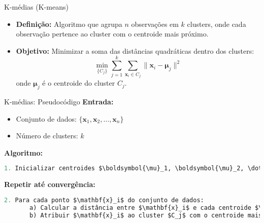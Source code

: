 \documentclass{beamer}
\begin{document}
\begin{frame}{K-médias (K-means)}
    \begin{itemize}
        \item \textbf{Definição:} Algoritmo que agrupa \( n \) observações em \( k \) clusters, onde cada observação pertence ao cluster com o centroide mais próximo.
        \item \textbf{Objetivo:} Minimizar a soma das distâncias quadráticas dentro dos clusters:
        \[
        \min_{\{C_j\}} \sum_{j=1}^{k} \sum_{\mathbf{x}_i \in C_j} \|\mathbf{x}_i - \boldsymbol{\mu}_j\|^2
        \]
        onde \( \boldsymbol{\mu}_j \) é o centroide do cluster \( C_j \).
    \end{itemize}
     \vspace{-0.5cm}
    \begin{center}
    \end{center}
\end{frame}


\begin{frame}[fragile]{K-médias: Pseudocódigo}
    \textbf{Entrada:}
    \begin{itemize}
        \item Conjunto de dados: \( \{\mathbf{x}_1, \mathbf{x}_2, \dots, \mathbf{x}_n\} \)
        \item Número de clusters: \( k \)
    \end{itemize}
    \vspace{0.3cm}
    \textbf{Algoritmo:}
    \begin{lstlisting}[language=Python, mathescape=true]
1. Inicializar centroides $\boldsymbol{\mu}_1, \boldsymbol{\mu}_2, \dots, \boldsymbol{\mu}_k$ escolhendo $k$ pontos aleatórios do conjunto de dados.
    \end{lstlisting}
    \vspace{0.3cm}
    \textbf{Repetir até convergência:}
    \begin{lstlisting}[language=Python, mathescape=true]
2. Para cada ponto $\mathbf{x}_i$ do conjunto de dados:
       a) Calcular a distância entre $\mathbf{x}_i$ e cada centroide $\boldsymbol{\mu}_j$.
       b) Atribuir $\mathbf{x}_i$ ao cluster $C_j$ com o centroide mais próximo.
    \end{lstlisting}
\end{frame}
\end{document}
